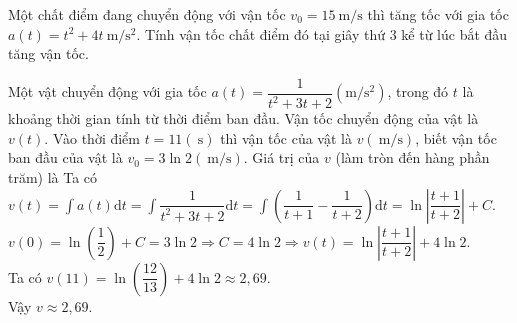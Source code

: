 \begin{bt}%
	Một chất điểm đang chuyển động với vận tốc  $v_0=15~\mathrm{m/s}$ thì tăng tốc với gia tốc $a(t)=t^2+4t~\mathrm{m/s^2}$. Tính vận tốc chất điểm đó tại giây thứ $3$ kể từ lúc bắt đầu tăng vận tốc.
\end{bt}

\begin{bt}%
	Một vật chuyển động với gia tốc $a(t)=\dfrac{1}{t^2+3 t+2} \left(\mathrm{m} / \mathrm{s}^2\right)$, trong đó $t$ là khoảng thời gian tính từ thời điểm ban đầu. Vận tốc chuyển động của vật là $v(t)$. Vào thời điểm $t=11(\mathrm{~s})$ thì vận tốc của vật là $v(\mathrm{~m} / \mathrm{s})$, biết vận tốc ban đầu của vật là $v_0=3 \ln 2(\mathrm{~m} / \mathrm{s})$. Giá trị của $v$ (làm tròn đến hàng phần trăm) là
	\loigiai
	{Ta có $v(t)=\displaystyle\int\limits a(t) \mathrm{d}t=\displaystyle\int\limits\dfrac{1}{t^2+3 t+2} \mathrm{d}t=\displaystyle\int\limits\left(\dfrac{1}{t+1}-\dfrac{1}{t+2}\right) \mathrm{d}t=\ln \left|\dfrac{t+1}{t+2}\right|+C$.\\
		$v(0)=\ln \left(\dfrac{1}{2}\right)+C=3 \ln 2 \Rightarrow C=4 \ln 2 \Rightarrow v(t)=\ln \left|\dfrac{t+1}{t+2}\right|+4 \ln 2$.\\
		Ta có $v(11)=\ln \left(\dfrac{12}{13}\right)+4 \ln 2 \approx 2{,}69$.\\
		Vậy $v \approx 2{,}69$.
	}
\end{bt}

